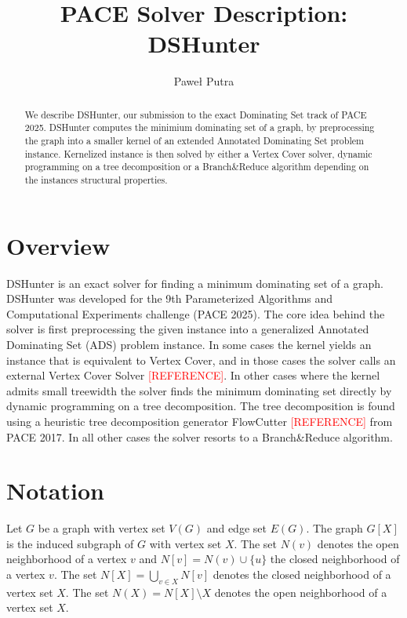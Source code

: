 \documentclass[a4paper,UKenglish,cleveref, autoref, thm-restate]{lipics-v2021}
\title{PACE Solver Description: DSHunter} %
\author{Paweł Putra}{University of Warsaw, Poland }{pawelputra0@gmail.com}{}{}%
\begin{document}
\maketitle

\begin{abstract}
We describe DSHunter, our submission to the exact Dominating Set track of PACE 2025. DSHunter computes the minimium dominating set of a graph, by preprocessing the graph
into a smaller kernel of an extended Annotated Dominating Set problem instance. 
Kernelized instance is then solved by either a Vertex Cover solver, dynamic programming on a tree decomposition or a Branch\&Reduce algorithm depending on the instances structural properties.
\end{abstract}

\section{Overview}
\label{sec:overview}

DSHunter is an exact solver for finding a minimum dominating set of a graph.  DSHunter was developed for the 9th Parameterized Algorithms and Computational Experiments challenge (PACE 2025).
The core idea behind the solver is first preprocessing the given instance into a generalized Annotated Dominating Set (ADS) problem instance.
In some cases the kernel yields an instance that is equivalent to Vertex Cover, and in those cases the solver calls an external Vertex Cover Solver \textcolor{red}{[REFERENCE]}.
In other cases where the kernel admits small treewidth the solver finds the minimum dominating set directly by dynamic programming on a tree decomposition.
The tree decomposition is found using a heuristic tree decomposition generator  FlowCutter \textcolor{red}{[REFERENCE]} from PACE 2017.
In all other cases the solver resorts to a Branch\&Reduce algorithm.


\section{Notation}

Let $G$ be a graph with vertex set $V(G)$ and edge set $E(G)$. The graph $G[X]$ is the induced subgraph of $G$ with vertex set $X$.
The set $N(v)$ denotes the open neighborhood of a vertex $v$ and $N[v] = N(v) \cup \{u\}$ the closed neighborhood of a vertex $v$.
The set $N[X] = \bigcup_{v \in X} N[v]$ denotes the closed neighborhood of a vertex set $X$.
The set $N(X) = N[X] \setminus X$ denotes the open neighborhood of a vertex set $X$.
\end{document}
